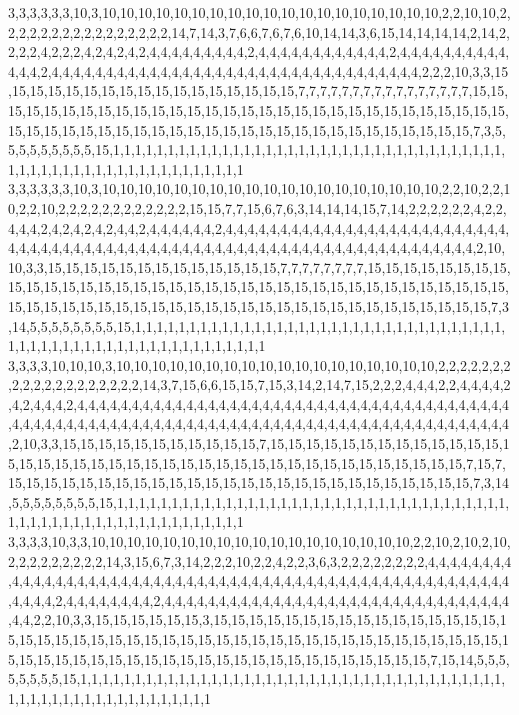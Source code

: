 3,3,3,3,3,3,10,3,10,10,10,10,10,10,10,10,10,10,10,10,10,10,10,10,10,10,10,2,2,10,10,2,2,2,2,2,2,2,2,2,2,2,2,2,2,2,2,14,7,14,3,7,6,6,7,6,7,6,10,14,14,3,6,15,14,14,14,14,2,14,2,2,2,2,4,2,2,2,4,2,4,2,4,2,4,4,4,4,4,4,4,4,4,2,4,4,4,4,4,4,4,4,4,4,4,4,2,4,4,4,4,4,4,4,4,4,4,4,4,4,2,4,4,4,4,4,4,4,4,4,4,4,4,4,4,4,4,4,4,4,4,4,4,4,4,4,4,4,4,4,4,4,4,4,4,2,2,2,10,3,3,15,15,15,15,15,15,15,15,15,15,15,15,15,15,15,15,15,7,7,7,7,7,7,7,7,7,7,7,7,7,7,7,7,15,15,15,15,15,15,15,15,15,15,15,15,15,15,15,15,15,15,15,15,15,15,15,15,15,15,15,15,15,15,15,15,15,15,15,15,15,15,15,15,15,15,15,15,15,15,15,15,15,15,15,15,15,15,15,15,7,3,5,5,5,5,5,5,5,5,5,15,1,1,1,1,1,1,1,1,1,1,1,1,1,1,1,1,1,1,1,1,1,1,1,1,1,1,1,1,1,1,1,1,1,1,1,1,1,1,1,1,1,1,1,1,1,1,1,1,1,1,1,1,1,1,1,1,1,1
3,3,3,3,3,3,10,3,10,10,10,10,10,10,10,10,10,10,10,10,10,10,10,10,10,10,10,2,2,10,2,2,10,2,2,10,2,2,2,2,2,2,2,2,2,2,2,2,15,15,7,7,15,6,7,6,3,14,14,14,15,7,14,2,2,2,2,2,2,4,2,2,4,4,4,2,4,2,4,2,4,2,4,4,2,4,4,4,4,4,4,2,4,4,4,4,4,4,4,4,4,4,4,4,4,4,4,4,4,4,4,4,4,4,4,4,4,4,4,4,4,4,4,4,4,4,4,4,4,4,4,4,4,4,4,4,4,4,4,4,4,4,4,4,4,4,4,4,4,4,4,4,4,4,4,4,4,4,4,4,4,2,10,10,3,3,15,15,15,15,15,15,15,15,15,15,15,15,15,7,7,7,7,7,7,7,7,15,15,15,15,15,15,15,15,15,15,15,15,15,15,15,15,15,15,15,15,15,15,15,15,15,15,15,15,15,15,15,15,15,15,15,15,15,15,15,15,15,15,15,15,15,15,15,15,15,15,15,15,15,15,15,15,15,15,15,15,15,15,15,7,3,14,5,5,5,5,5,5,5,5,15,1,1,1,1,1,1,1,1,1,1,1,1,1,1,1,1,1,1,1,1,1,1,1,1,1,1,1,1,1,1,1,1,1,1,1,1,1,1,1,1,1,1,1,1,1,1,1,1,1,1,1,1,1,1,1,1,1,1
3,3,3,3,10,10,10,3,10,10,10,10,10,10,10,10,10,10,10,10,10,10,10,10,10,10,2,2,2,2,2,2,2,2,2,2,2,2,2,2,2,2,2,2,2,14,3,7,15,6,6,15,15,7,15,3,14,2,14,7,15,2,2,2,4,4,4,2,2,4,4,4,4,2,4,2,4,4,4,2,4,4,4,4,4,4,4,4,4,4,4,4,4,4,4,4,4,4,4,4,4,4,4,4,4,4,4,4,4,4,4,4,4,4,4,4,4,4,4,4,4,4,4,4,4,4,4,4,4,4,4,4,4,4,4,4,4,4,4,4,4,4,4,4,4,4,4,4,4,4,4,4,4,4,4,4,4,4,4,4,4,4,4,4,4,4,2,10,3,3,15,15,15,15,15,15,15,15,15,15,15,7,15,15,15,15,15,15,15,15,15,15,15,15,15,15,15,15,15,15,15,15,15,15,15,15,15,15,15,15,15,15,15,15,15,15,15,15,15,15,15,7,15,7,15,15,15,15,15,15,15,15,15,15,15,15,15,15,15,15,15,15,15,15,15,15,15,15,15,15,7,3,14,5,5,5,5,5,5,5,5,15,1,1,1,1,1,1,1,1,1,1,1,1,1,1,1,1,1,1,1,1,1,1,1,1,1,1,1,1,1,1,1,1,1,1,1,1,1,1,1,1,1,1,1,1,1,1,1,1,1,1,1,1,1,1,1,1,1,1
3,3,3,3,10,3,3,10,10,10,10,10,10,10,10,10,10,10,10,10,10,10,10,10,10,2,2,10,2,10,2,10,2,2,2,2,2,2,2,2,2,14,3,15,6,7,3,14,2,2,2,10,2,2,4,2,2,3,6,3,2,2,2,2,2,2,2,2,4,4,4,4,4,4,4,4,4,4,4,4,4,4,4,4,4,4,4,4,4,4,4,4,4,4,4,4,4,4,4,4,4,4,4,4,4,4,4,4,4,4,4,4,4,4,4,4,4,4,4,4,4,4,4,4,4,4,2,4,4,4,4,4,4,4,4,2,4,4,4,4,4,4,4,4,4,4,4,4,4,4,4,4,4,4,4,4,4,4,4,4,4,4,4,4,4,4,4,4,4,4,2,2,10,3,3,15,15,15,15,15,15,3,15,15,15,15,15,15,15,15,15,15,15,15,15,15,15,15,15,15,15,15,15,15,15,15,15,15,15,15,15,15,15,15,15,15,15,15,15,15,15,15,15,15,15,15,15,15,15,15,15,15,15,15,15,15,15,15,15,15,15,15,15,15,15,15,15,15,15,15,7,15,14,5,5,5,5,5,5,5,5,15,1,1,1,1,1,1,1,1,1,1,1,1,1,1,1,1,1,1,1,1,1,1,1,1,1,1,1,1,1,1,1,1,1,1,1,1,1,1,1,1,1,1,1,1,1,1,1,1,1,1,1,1,1,1,1,1,1,1
